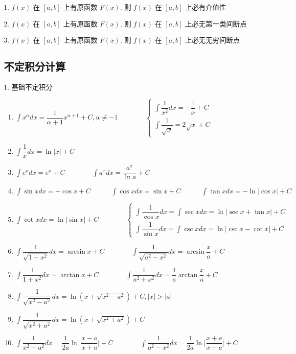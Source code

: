 \begin{theorem}
	1. $f(x)$ 在 $[a,b]$ 上有原函数 $F(x)$, 则 $f(x)$ 在 $[a,b]$ 上必有介值性

	2. $f(x)$ 在 $[a,b]$ 上有原函数 $F(x)$, 则 $f(x)$ 在 $[a,b]$ 上必无第一类间断点

	3. $f(x)$ 在 $[a,b]$ 上有原函数 $F(x)$, 则 $f(x)$ 在 $[a,b]$ 上必无无穷间断点
\end{theorem}
\subsection{不定积分计算}
\begin{theorem}[常用不定积分]
	1. 基础不定积分
	\begin{enumerate}
		\item $\int x^{\alpha}dx = \dfrac{1}{\alpha + 1}x^{\alpha + 1} + C, \alpha\neq -1\qquad \qquad  \begin{cases} \int \dfrac{1}{x^{2}}dx = -\dfrac{1}{x} + C  \\ \int \dfrac{1}{\sqrt{x}} = 2\sqrt{x} +C \end{cases}$
		\item $\int \dfrac{1}{x}dx = \ln |x| +C$
		\item $\int e^{x}dx = e^{x} + C\qquad \qquad \int a^{x}dx = \dfrac{a^{x}}{\ln a} + C$
		\item $\int \sin xdx = -\cos x + C \quad \qquad \int \cos xdx  =\sin x +C \quad \qquad \int \tan xdx = -\ln |\cos x| + C$
		\item $\int \cot xdx = \ln|\sin x| + C \qquad \qquad \begin{cases} \int \dfrac{1}{\cos x}dx = \int \sec xdx = \ln |\sec x+\tan x| + C \\ \int\dfrac{1}{\sin x}dx = \int \csc xdx = \ln |\csc x -\cot x| + C  \end{cases}$
		\item $\int \dfrac{1}{\sqrt{1-x^{2}}}dx = \arcsin x + C\qquad \qquad \int \dfrac{1}{\sqrt{a^{2}-x^{2}}}dx = \arcsin \dfrac{x}{a} + C$
		\item $\int \dfrac{1}{1+x^{2}}dx = \arctan x + C\qquad \qquad \int \dfrac{1}{a^{2}+x^{2}}dx = \dfrac{1}{a}\arctan \dfrac{x}{a} + C$
		\item $\int \dfrac{1}{\sqrt{x^{2}-a^{2}}}dx = \ln (x+\sqrt{x^{2}-a^{2}}) + C, |x| > |a|$
		\item $\int \dfrac{1}{\sqrt{x^{2}+a^{2}}}dx = \ln (x+\sqrt{x^{2}+a^{2}}) + C $
		\item $\int \dfrac{1}{x^{2}-a^{2}}dx = \dfrac{1}{2a} \ln \big|\dfrac{x-a}{x+a}\big| + C\qquad \qquad \int \dfrac{1}{a^{2}-x^{2}}dx = \dfrac{1}{2a} \ln \big|\dfrac{x+a}{x-a}\big| + C$

\end{enumerate}
\end{theorem}
